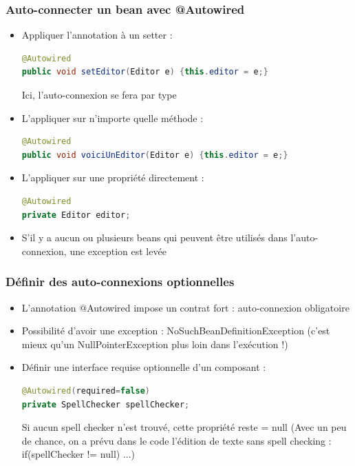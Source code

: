 \documentclass{beamer}
\begin{document}
\begin{frame}[fragile]
  \frametitle{Auto-connecter un bean avec @Autowired}
  \begin{itemize}
  \item Appliquer l'annotation à un setter :
\begin{lstlisting}[language=Java,basicstyle=\scriptsize]    
@Autowired
public void setEditor(Editor e) {this.editor = e;}
\end{lstlisting}
Ici, l'auto-connexion se fera par type
\item L'appliquer sur n'importe quelle méthode :
\begin{lstlisting}[language=Java,basicstyle=\scriptsize]      
@Autowired
public void voiciUnEditor(Editor e) {this.editor = e;}
\end{lstlisting}
\item L'appliquer sur une propriété directement :
\begin{lstlisting}[language=Java,basicstyle=\scriptsize]      
@Autowired
private Editor editor;
\end{lstlisting}
\item S'il y a aucun ou plusieurs beans qui peuvent être utilisés dans
  l'auto-connexion, une exception est levée
  \end{itemize}
\end{frame}

\begin{frame}[fragile]
  \frametitle{Définir des auto-connexions optionnelles}
  \begin{itemize}
  \item L'annotation @Autowired impose un contrat fort : auto-connexion
obligatoire
\item Possibilité d'avoir une exception : NoSuchBeanDefinitionException
(c'est mieux qu'un NullPointerException plus loin dans l'exécution !)
\item Définir une interface requise optionnelle d'un composant :
\begin{lstlisting}[language=Java,basicstyle=\scriptsize]        
@Autowired(required=false)
private SpellChecker spellChecker;
\end{lstlisting}
Si aucun spell checker n'est trouvé, cette propriété reste = null
(Avec un peu de chance, on a prévu dans le code l'édition de texte
sans spell checking : if(spellChecker != null) ...)
  \end{itemize}
\end{frame}
\end{document}

